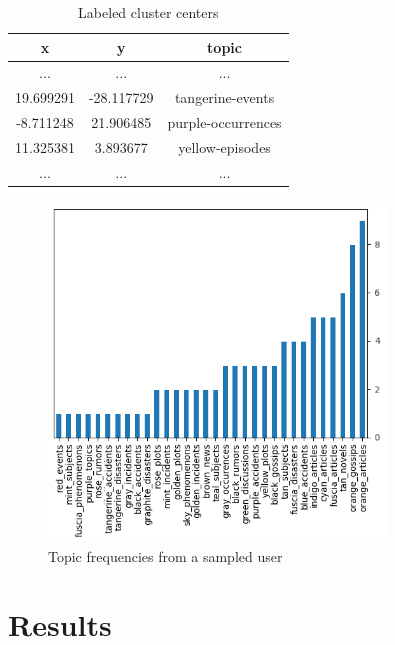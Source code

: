 \documentclass[ecp,tc,english]{iiufrgs}
\begin{document}
        
        \begin{table}[H]
            \centering
                \begin{tabular}{ |c|c|c| } 
                \hline
                x & y & topic \\
                \hline 
                ... & ...  & ... \\
                19.699291 & -28.117729 & tangerine-events \\ 
                -8.711248 & 21.906485 & purple-occurrences \\ 
                11.325381 & 3.893677 & yellow-episodes \\ 
                ... & ...  & ...  \\
                \hline
                \end{tabular}
            \caption{Labeled cluster centers}
            \label{tab:labeled_clusters}
        \end{table}
        
        \begin{figure}[H]
            \centering
            \includegraphics[width=0.8\textwidth]{images/benford.png}
            \caption{Topic frequencies from a sampled user}
            \label{fig:benford}
        \end{figure}


\chapter{Results} \label{results}
\end{document}
